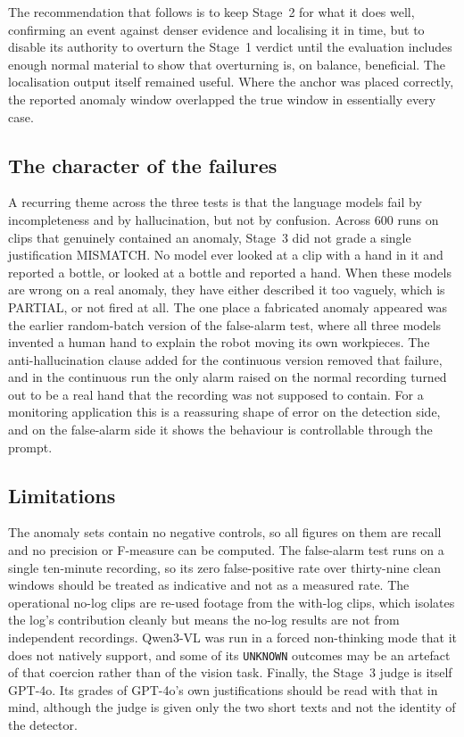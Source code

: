 \documentclass[11pt,a4paper]{article}
\begin{document}
The recommendation that follows is to keep Stage~2 for what it does well,
confirming an event against denser evidence and localising it in time, but
to disable its authority to overturn the Stage~1 verdict until the
evaluation includes enough normal material to show that overturning is, on
balance, beneficial. The localisation output itself remained useful. Where
the anchor was placed correctly, the reported anomaly window overlapped
the true window in essentially every case.

\subsection{The character of the failures}

A recurring theme across the three tests is that the language models fail
by incompleteness and by hallucination, but not by confusion. Across 600
runs on clips that genuinely contained an anomaly, Stage~3 did not grade a
single justification MISMATCH. No model ever looked at a clip with a hand
in it and reported a bottle, or looked at a bottle and reported a hand.
When these models are wrong on a real anomaly, they have either described
it too vaguely, which is PARTIAL, or not fired at all. The one place a
fabricated anomaly appeared was the earlier random-batch version of the
false-alarm test, where all three models invented a human hand to explain
the robot moving its own workpieces. The anti-hallucination clause added
for the continuous version removed that failure, and in the continuous run
the only alarm raised on the normal recording turned out to be a real hand
that the recording was not supposed to contain. For a monitoring
application this is a reassuring shape of error on the detection side, and
on the false-alarm side it shows the behaviour is controllable through the
prompt.

\subsection{Limitations}

The anomaly sets contain no negative controls, so all figures on them are
recall and no precision or F-measure can be computed. The false-alarm
test runs on a single ten-minute recording, so its zero false-positive
rate over thirty-nine clean windows should be treated as indicative and
not as a measured rate. The operational no-log clips are re-used footage from the
with-log clips, which isolates the log's contribution cleanly but means
the no-log results are not from independent recordings. Qwen3-VL was run
in a forced non-thinking mode that it does not natively support, and some
of its \texttt{UNKNOWN} outcomes may be an artefact of that coercion
rather than of the vision task. Finally, the Stage~3 judge is itself
GPT-4o. Its grades of GPT-4o's own justifications should be read with that
in mind, although the judge is given only the two short texts and not the
identity of the detector.
\end{document}
